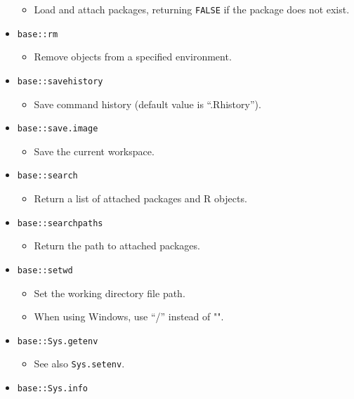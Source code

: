 \documentclass[
]{book}
\providecommand{\tightlist}{%
  \setlength{\itemsep}{0pt}\setlength{\parskip}{0pt}}
\begin{document}
\begin{itemize}
  \begin{itemize}
  \tightlist
  \item
    Load and attach packages, returning \texttt{FALSE} if the package does not exist.
  \end{itemize}
\item
  \texttt{base::rm}

  \begin{itemize}
  \tightlist
  \item
    Remove objects from a specified environment.
  \end{itemize}
\item
  \texttt{base::savehistory}

  \begin{itemize}
  \tightlist
  \item
    Save command history (default value is ``.Rhistory'').
  \end{itemize}
\item
  \texttt{base::save.image}

  \begin{itemize}
  \tightlist
  \item
    Save the current workspace.
  \end{itemize}
\item
  \texttt{base::search}

  \begin{itemize}
  \tightlist
  \item
    Return a list of attached packages and R objects.
  \end{itemize}
\item
  \texttt{base::searchpaths}

  \begin{itemize}
  \tightlist
  \item
    Return the path to attached packages.
  \end{itemize}
\item
  \texttt{base::setwd}

  \begin{itemize}
  \tightlist
  \item
    Set the working directory file path.
  \item
    When using Windows, use ``/'' instead of "".
  \end{itemize}
\item
  \texttt{base::Sys.getenv}

  \begin{itemize}
  \tightlist
  \item
    See also \texttt{Sys.setenv}.
  \end{itemize}
\item
  \texttt{base::Sys.info}


\end{itemize}
\end{document}
